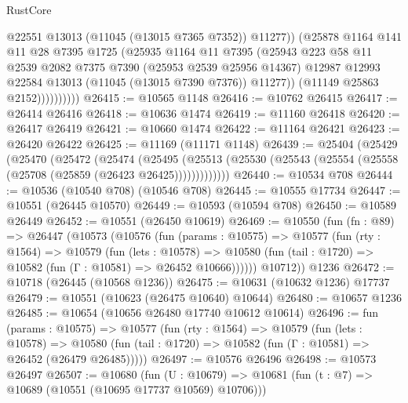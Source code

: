 \begin{lexlean}{RustCore}
\begin{coremodule}
                        @22551
                        @13013
                        (@11045 (@13015 @7365 @7352))
                        @11277))
                    (@25878
                      @1164
                      @141
                      @11
                      @28
                      @7395
                      @1725
                      (@25935
                        @1164
                        @11
                        @7395
                        (@25943
                          @223
                          @58
                          @11
                          @2539
                          @2082
                          @7375
                          @7390
                          (@25953 @2539 @25956 @14367)
                          @12987
                          @12993
                          @22584
                          @13013
                          (@11045 (@13015 @7390 @7376))
                          @11277))
                      (@11149 @25863 @2152))))))))))
@26415 := @10565 @1148
@26416 := @10762 @26415
@26417 := @26414 @26416
@26418 := @10636 @1474
@26419 := @11160 @26418
@26420 := @26417 @26419
@26421 := @10660 @1474
@26422 := @11164 @26421
@26423 := @26420 @26422
@26425 := @11169 (@11171 @1148)
@26439 := @25404
    (@25429
      (@25470
        (@25472
          (@25474
            (@25495
              (@25513 (@25530 (@25543 (@25554 (@25558 (@25708 (@25859 (@26423 @26425)))))))))))))
@26440 := @10534 @708
@26444 := @10536 (@10540 @708) (@10546 @708)
@26445 := @10555 @17734
@26447 := @10551 (@26445 @10570)
@26449 := @10593 (@10594 @708)
@26450 := @10589 @26449
@26452 := @10551 (@26450 @10619)
@26469 := @10550
    (fun (fn : @89) =>
    @26447
      (@10573
        (@10576
          (fun (params : @10575) =>
          @10577
            (fun (rty : @1564) =>
            @10579
              (fun (lets : @10578) =>
              @10580 (fun (tail : @1720) => @10582 (fun (Γ : @10581) => @26452 @10666))))))
        @10712))
    @1236
@26472 := @10718 (@26445 (@10568 @1236))
@26475 := @10631 (@10632 @1236) @17737
@26479 := @10551 (@10623 (@26475 @10640) @10644)
@26480 := @10657 @1236
@26485 := @10654 (@10656 @26480 @17740 @10612 @10614)
@26496 := fun (params : @10575) =>
  @10577
    (fun (rty : @1564) =>
    @10579
      (fun (lets : @10578) =>
      @10580 (fun (tail : @1720) => @10582 (fun (Γ : @10581) => @26452 (@26479 @26485)))))
@26497 := @10576 @26496
@26498 := @10573 @26497
@26507 := @10680
    (fun (U : @10679) => @10681 (fun (t : @7) => @10689 (@10551 (@10695 @17737 @10569) @10706)))

\end{coremodule}
\end{lexlean}
